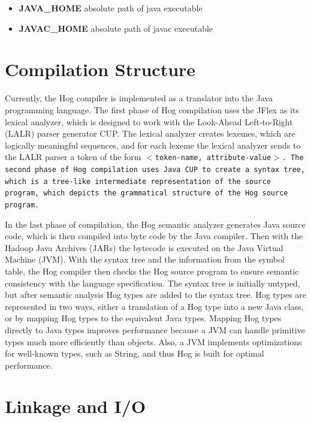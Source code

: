 \documentclass{report}
\begin{document}
\begin{itemize}

\item[] \textbf{JAVA\_HOME} absolute path of java executable
\item[] \textbf{JAVAC\_HOME} absolute path of javac executable

\end{itemize}


\section{Compilation Structure} %
\label{sec:parsing_tools}

Currently, the Hog compiler is implemented as a translator into the Java
programming language. The first phase of Hog compilation uses the JFlex as its
lexical analyzer, which is designed to work with the Look-Ahead Left-to-Right
(LALR) parser generator CUP. The lexical analyzer creates lexemes, which are
logically meaningful sequences, and for each lexeme the lexical analyzer sends
to the LALR parser a token of the form \tt $<$token-name,
attribute-value$>$\rm. The second phase of Hog compilation uses Java CUP to
create a syntax tree, which is a tree-like intermediate representation of the
source program, which depicts the grammatical structure of the Hog source
program.

In the last phase of compilation, the Hog semantic analyzer generates Java source
code, which is then compiled into byte code by the Java compiler. Then with the
Hadoop Java Archives (JARs) the bytecode is executed on the Java Virtual Machine
(JVM). With the syntax tree and the information from the symbol table, the Hog
compiler then checks the Hog source program to ensure semantic consistency with
the language specification. The syntax tree is initially untyped, but after
semantic analysis Hog types are added to the syntax tree. Hog types are
represented in two ways, either a translation of a Hog type into a new Java class,
or by mapping Hog types to the equivalent Java types. Mapping Hog types directly
to Java types improves performance because a JVM can handle primitive types much
more efficiently than objects. Also, a JVM implements optimizations for well-known
types, such as String, and thus Hog is built for optimal performance.


\section{Linkage and I/O} %
\label{sec:linkage_and_i_o}
\end{document}
